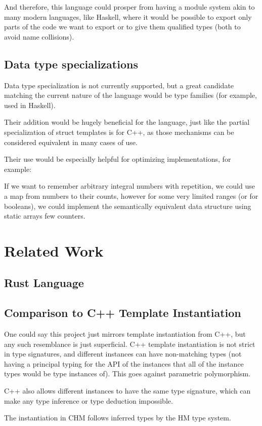 And therefore, this language could prosper from having a module system akin to many modern languages, like Haskell, where it would be possible to export only parts of the code we want to export or to give them qualified types (both to avoid name collisions).

\subsection{Data type specializations}

Data type specialization is not currently supported, but a great candidate matching the current nature of the language would be type families (for example, used in Haskell).

Their addition would be hugely beneficial for the language, just like the partial specialization of struct templates is for C++, as those mechanisms can be considered equivalent in many cases of use.

Their use would be especially helpful for optimizing implementations, for example:

If we want to remember arbitrary integral numbers with repetition, we could use a map from numbers to their counts, however for some very limited ranges (or for booleans), we could implement the semantically equivalent data structure using static arrays few counters.


\section{Related Work}

\subsection{Rust Language}

\subsection{Comparison to C++ Template Instantiation}

One could say this project just mirrors template instantiation from C++, but any such resemblance is just superficial. C++ template instantiation is not strict in type signatures, and different instances can have non-matching types (not having a principal typing for the API of the instances that all of the instance types would be type instances of). This goes against parametric polymorphism.

C++ also allows different instances to have the same type signature, which can make any type inference or type deduction impossible.

The instantiation in CHM follows inferred types by the HM type system.
